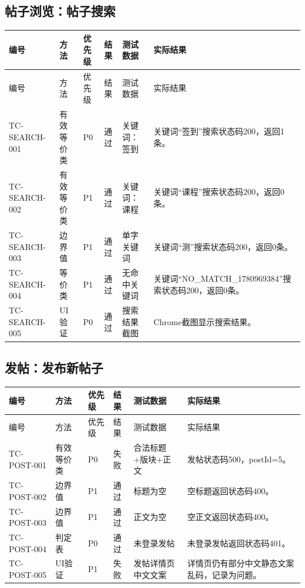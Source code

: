 \documentclass[bwprint]{report}
\begin{document}
\subsection{帖子浏览：帖子搜索}
{\footnotesize
\setlength{\tabcolsep}{3pt}
\begin{longtable}{P{2.0cm}P{2.0cm}P{0.9cm}P{0.9cm}P{3.4cm}P{5.4cm}}
\toprule
编号 & 方法 & 优先级 & 结果 & 测试数据 & 实际结果\\
\midrule
\endfirsthead
\toprule
编号 & 方法 & 优先级 & 结果 & 测试数据 & 实际结果\\
\midrule
\endhead
TC-SEARCH-001 & 有效等价类 & P0 & 通过 & 关键词：签到 & 关键词“签到”搜索状态码200，返回1条。 \\
TC-SEARCH-002 & 有效等价类 & P1 & 通过 & 关键词：课程 & 关键词“课程”搜索状态码200，返回0条。 \\
TC-SEARCH-003 & 边界值 & P1 & 通过 & 单字关键词 & 关键词“测”搜索状态码200，返回0条。 \\
TC-SEARCH-004 & 等价类 & P1 & 通过 & 无命中关键词 & 关键词“NO\_MATCH\_1780969384”搜索状态码200，返回0条。 \\
TC-SEARCH-005 & UI验证 & P0 & 通过 & 搜索结果截图 & Chrome截图显示搜索结果。 \\
\bottomrule
\end{longtable}
}
\subsection{发帖：发布新帖子}
{\footnotesize
\setlength{\tabcolsep}{3pt}
\begin{longtable}{P{2.0cm}P{2.0cm}P{0.9cm}P{0.9cm}P{3.4cm}P{5.4cm}}
\toprule
编号 & 方法 & 优先级 & 结果 & 测试数据 & 实际结果\\
\midrule
\endfirsthead
\toprule
编号 & 方法 & 优先级 & 结果 & 测试数据 & 实际结果\\
\midrule
\endhead
TC-POST-001 & 有效等价类 & P0 & 失败 & 合法标题+版块+正文 & 发帖状态码500，postId=5。 \\
TC-POST-002 & 边界值 & P1 & 通过 & 标题为空 & 空标题返回状态码400。 \\
TC-POST-003 & 边界值 & P1 & 通过 & 正文为空 & 空正文返回状态码400。 \\
TC-POST-004 & 判定表 & P0 & 通过 & 未登录发帖 & 未登录发帖返回状态码401。 \\
TC-POST-005 & UI验证 & P1 & 失败 & 发帖详情页中文文案 & 详情页仍有部分中文静态文案乱码，记录为问题。 \\
\bottomrule
\end{longtable}
}
\end{document}
